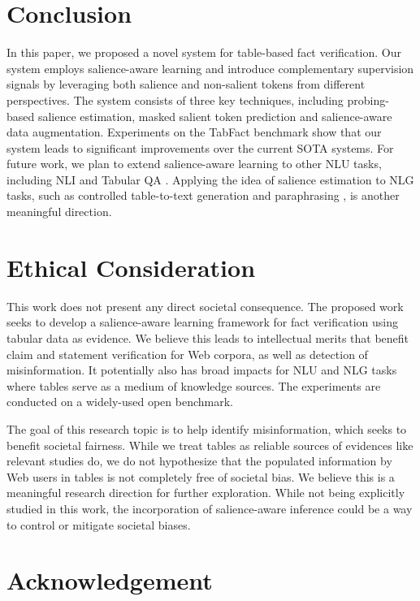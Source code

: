 \documentclass[11pt]{article}
\begin{document}
 \section{Conclusion}

In this paper, we proposed a novel system for table-based fact verification.
Our system employs salience-aware learning and introduce complementary supervision signals by leveraging both salience and non-salient tokens from different perspectives. 
The system consists of three key techniques, including probing-based salience estimation, masked salient token prediction and salience-aware data augmentation.
Experiments on the TabFact benchmark show that our system leads to significant improvements over the current SOTA systems.
For future work, we plan to extend salience-aware learning to other NLU tasks, including NLI \cite{bowman2015large, williams2018broad} and Tabular QA \cite{sun2016table,chen2020hybridqa}.
Applying the idea of salience estimation to NLG tasks, such as controlled table-to-text generation \cite{parikh2020totto} and paraphrasing \cite{iyyer2018adversarial, huang2021generating}, is another meaningful direction.  \section*{Ethical Consideration}

This work does not present any direct societal consequence. 
The proposed work seeks to develop a salience-aware learning framework for fact verification using tabular data as evidence. 
We believe this leads to intellectual merits that benefit claim and statement verification for Web corpora, as well as detection of misinformation. 
It potentially also has broad impacts for NLU and NLG tasks where tables serve as a medium of knowledge sources.
The experiments are conducted on a widely-used open benchmark.


The goal of this research topic is to help identify misinformation, which seeks to benefit societal fairness.
While we treat tables as reliable sources of evidences like relevant studies do, we do not hypothesize that the populated information by Web users in tables is not completely free of societal bias. We believe this is a meaningful research direction for further exploration. While not being explicitly studied in this work, the incorporation of salience-aware inference could be a way to control or mitigate societal biases.



\section*{Acknowledgement}
\end{document}
